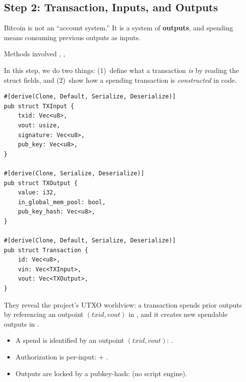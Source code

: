 \subsection{Step 2: Transaction, Inputs, and Outputs}
\label{sec:step2-transaction}

Bitcoin is not an ``account system.'' It is a system of \textbf{outputs},
and spending means consuming previous outputs as inputs.

\begin{infobox}{Methods involved}
,
,
\end{infobox}

In this step, we do two things: (1)~define what a transaction \emph{is}
by reading the struct fields, and (2)~show how a spending transaction is
\emph{constructed} in code.

\begin{listing}[htbp]
\caption{Transaction, TXInput, and TXOutput structs ()}
\label{lst:9-2-structs}
\begin{verbatim}
#[derive(Clone, Default, Serialize, Deserialize)]
pub struct TXInput {
    txid: Vec<u8>,
    vout: usize,
    signature: Vec<u8>,
    pub_key: Vec<u8>,
}

#[derive(Clone, Serialize, Deserialize)]
pub struct TXOutput {
    value: i32,
    in_global_mem_pool: bool,
    pub_key_hash: Vec<u8>,
}

#[derive(Clone, Default, Serialize, Deserialize)]
pub struct Transaction {
    id: Vec<u8>,
    vin: Vec<TXInput>,
    vout: Vec<TXOutput>,
}
\end{verbatim}
\end{listing}

They reveal the project's UTXO worldview: a transaction spends prior
outputs by referencing an outpoint $(txid, vout)$ in , and
it creates new spendable outputs in .

\begin{itemize}
  \item A spend is identified by an outpoint $(txid, vout)$: .
  \item Authorization is per-input:  + .
  \item Outputs are locked by a pubkey-hash:  (no script engine).
\end{itemize}

